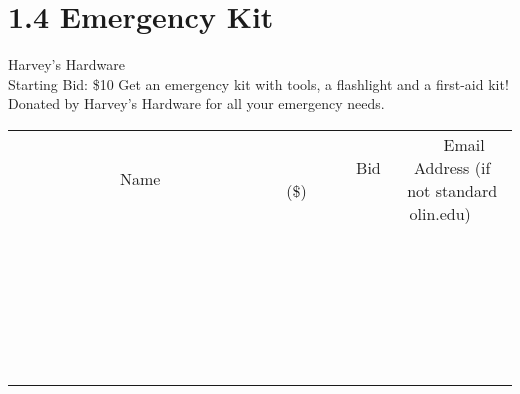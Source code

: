 \documentclass[11pt]{article}
\begin{document}
\section*{1.4 Emergency Kit}
Harvey's Hardware
\\
Starting Bid: \$10
\newline
Get an emergency kit with tools, a flashlight and a first-aid kit! Donated by Harvey's Hardware for all your emergency needs.
\\[6ex]
\begin{tabular}{c c c}
~~~~~~~~~~~~~Name~~~~~~~~~~~~~ & ~~~~~~~~~Bid (\$)~~~~~~~~~  & ~~~Email Address (if not standard olin.edu)~~~\\
 & & \\
\hline
 & & \\
\hline
 & & \\
\hline
 & & \\
\hline
 & & \\
\hline
 & & \\
\hline
 & & \\
\hline
 & & \\
\hline
 & & \\
\hline
 & & \\
\hline
 & & \\
\hline
 & & \\
\hline
 & & \\
\hline
 & & \\
\hline
 & & \\
\hline
 & & \\
\hline
 & & \\
\hline
 & & \\
\hline
 & & \\
\hline
 & & \\
\hline
 & & \\
\hline
 & & \\
\hline
 & & \\
\hline
 & & \\
\hline
 & & \\
\hline
 & & \\
\hline
\end{tabular}
\newpage
\end{document}
